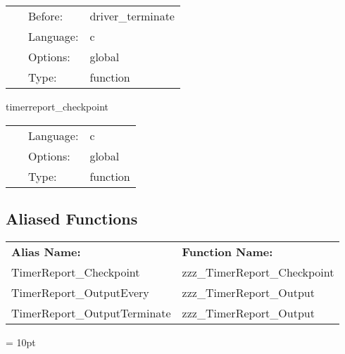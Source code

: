 \hspace{5mm}

 \begin{tabular*}{160mm}{cll} 
~ & Before:  & driver\_terminate \\ 
~ & Language:  & c \\ 
~ & Options:  & global \\ 
~ & Type:  & function \\ 
\end{tabular*} 


\vspace{5mm}


\hspace{5mm} timerreport\_checkpoint 

\hspace{5mm}{\it print the timer report } 


\hspace{5mm}

 \begin{tabular*}{160mm}{cll} 
~ & Language:  & c \\ 
~ & Options:  & global \\ 
~ & Type:  & function \\ 
\end{tabular*} 


\subsection*{Aliased Functions}

\hspace{5mm}

 \begin{tabular*}{160mm}{ll} 

{\bf Alias Name:} ~~~~~~~ & {\bf Function Name:} \\ 
TimerReport\_Checkpoint & zzz\_TimerReport\_Checkpoint \\ 
TimerReport\_OutputEvery & zzz\_TimerReport\_Output \\ 
TimerReport\_OutputTerminate & zzz\_TimerReport\_Output \\ 
\end{tabular*} 



\vspace{5mm}\parskip = 10pt 

